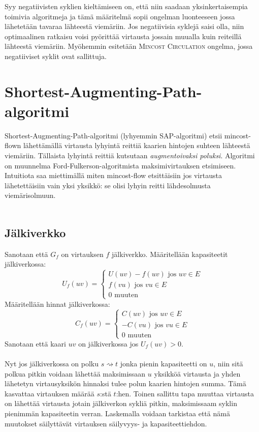 \documentclass[a4paper, 11pt]{article}
\begin{document}
\noindent
Syy negatiivisten syklien kieltämiseen on, että niin saadaan yksinkertaisempia toimivia
algoritmeja ja tämä määritelmä sopii ongelman luonteeseen
jossa lähetetään tavaraa lähteestä viemäriin. Jos negatiivisia syklejä saisi
olla, niin optimaalinen ratkaisu voisi pyörittää virtausta jossain muualla kuin reiteillä
lähteestä viemäriin. Myöhemmin esitetään \textsc{Mincost Circulation} ongelma, jossa
negatiiviset syklit ovat sallittuja.\\

\section*{Shortest-Augmenting-Path-algoritmi}
Shortest-Augmenting-Path-algoritmi (lyhyemmin SAP-algoritmi) etsii
mincost-flown lähettämällä
virtausta lyhyintä reittiä kaarien hintojen suhteen lähteestä viemäriin.
Tällaista lyhyintä reittiä kutsutaan \textit{augmentoivaksi poluksi}. Algoritmi 
on muunnelma Ford-Fulkerson-algoritmista 
maksimivirtauksen etsimiseen. Intuitiota saa miettimällä miten mincost-flow etsittäisiin
jos virtausta lähetettäisiin vain yksi yksikkö: se olisi lyhyin reitti lähdesolmusta
viemärisolmuun.\\\\
\noindent
\subsection*{Jälkiverkko}
Sanotaan että $G_f$ on virtauksen $f$ jälkiverkko. Määritellään kapasiteetit
jälkiverkossa:\\
$$U_f(uv) = \begin{cases} U(uv) - f(uv) \text{ jos } uv \in E\\
f(vu) \text{ jos } vu \in E\\
0 \text{ muuten}
\end{cases}$$
Määritellään hinnat jälkiverkossa:\\
$$C_f(uv) = \begin{cases} C(uv) \text{ jos } uv \in E\\
-C(vu) \text{ jos } vu \in E\\
0 \text{ muuten}
\end{cases}$$
Sanotaan että kaari $uv$ on jälkiverkossa jos $U_f(uv) > 0$.\\\\
\noindent
Nyt jos jälkiverkossa on polku $s \rightsquigarrow t$ jonka pienin kapasiteetti 
on $u$, niin sitä polkua pitkin voidaan lähettää maksimissaan $u$ yksikköä
virtausta ja yhden lähetetyn virtausyksikön hinnaksi tulee polun kaarien hintojen summa.
Tämä kasvattaa virtauksen määrää $s$:stä $t$:hen. Toinen sallittu tapa muuttaa virtausta
on lähettää virtausta jotain jälkiverkon sykliä pitkin, maksimissaam syklin pienimmän
kapasiteetin verran. Laskemalla voidaan tarkistaa että nämä muutokset säilyttävät
virtauksen säilyvyys- ja kapasiteettiehdon.\\\\
\noindent
\end{document}
